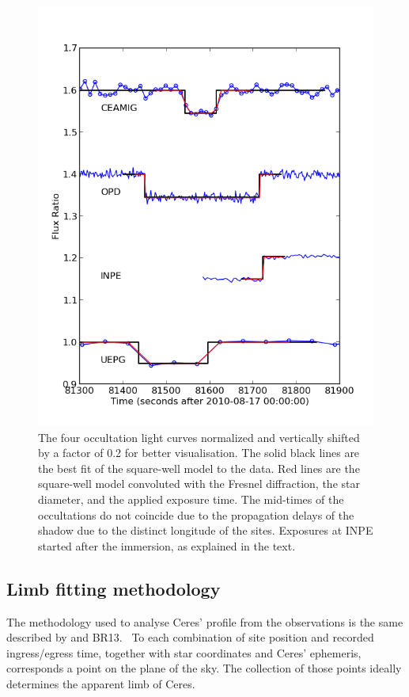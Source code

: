 \documentclass[useAMS,usenatbib]{mn2e}
\begin{document}
\begin{figure}
\includegraphics[scale=0.58]{figures/Ceres_2010_fluxratio.png} 
\caption{The four occultation light curves normalized and vertically shifted by a factor of 0.2 for better visualisation. The solid black lines are the best fit of the square-well model to the data. Red lines are the square-well model convoluted with the Fresnel diffraction, the star diameter, and the applied exposure time. The mid-times of the occultations do not coincide due to the propagation delays of the shadow due to the distinct longitude of the sites. Exposures at INPE started after the immersion, as explained in the text. \label{Fig: Ceres-2010-curves}}
\end{figure}


\subsection{Limb fitting methodology} \label{Sec: limbfittingmethod}

The methodology used to analyse Ceres' profile from the observations is the same described by \cite{Sicardy2011} and BR13.%
 ~To each combination of site position and recorded ingress/egress time, together with star coordinates and Ceres' ephemeris, corresponds a point on the plane of the sky. The collection of those points ideally determines the apparent limb of Ceres.
\end{document}
